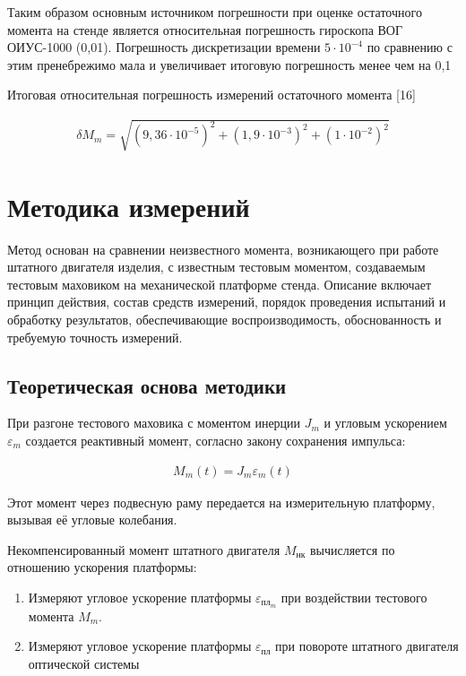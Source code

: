 Таким образом основным источником погрешности при оценке остаточного момента на стенде является относительная погрешность гироскопа ВОГ ОИУС-1000 (0,01). Погрешность дискретизации времени $5 \cdot 10^{-4}$ по сравнению с этим пренебрежимо мала и увеличивает итоговую погрешность менее чем на 0,1 %

Итоговая относительная погрешность измерений остаточного момента [16]

\begin{samepage}
	\begin{equation}
		\label{eq:final_moment_err}
		\begin{alignedat}{2}
			\delta M_m = \sqrt{(9,36 \cdot 10^{-5})^2+(1,9 \cdot 10^{-3})^2+(1\cdot 10^{-2})^2}
		\end{alignedat}
	\end{equation}
\end{samepage}

\section{Методика измерений}\label{sec:ch4/sect3}

Метод основан на сравнении неизвестного момента, возникающего при работе штатного двигателя изделия, с известным тестовым моментом, создаваемым тестовым маховиком на механической платформе стенда. Описание включает принцип действия, состав средств измерений, порядок проведения испытаний и обработку результатов, обеспечивающие воспроизводимость, обоснованность и требуемую точность измерений.

\subsection{Теоретическая основа методики}

При разгоне тестового маховика с моментом инерции $J_m$ и угловым ускорением $\varepsilon_m$ создается реактивный момент, согласно закону сохранения импульса:
\begin{samepage}
	\begin{equation}
		\label{eq:final_test_moment}
		\begin{alignedat}{2}
			M_m(t)=J_m\varepsilon_m(t)
		\end{alignedat}
	\end{equation}
\end{samepage}
Этот момент через подвесную раму передается на измерительную платформу, вызывая её угловые колебания.

Некомпенсированный момент штатного двигателя $M_{нк}$ вычисляется по отношению ускорения платформы:
\begin{enumerate}
	\item Измеряют угловое ускорение платформы $\varepsilon_{пл_m}$ при воздействии тестового момента $M_m$.
	\item Измеряют угловое ускорение платформы $\varepsilon_{пл}$ при повороте штатного двигателя оптической системы
\end{enumerate}

